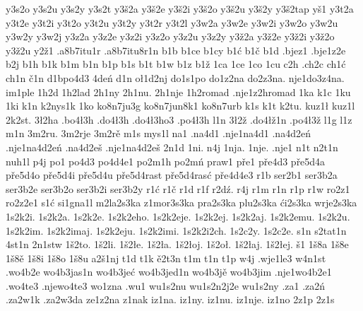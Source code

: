 {y3s2o
y3s2u
y3s2y
y3s2t
y3š2a
y3š2e
y3š2i
y3š2o
y3š2u
y3š2y
y3š2tap
yš1
y3t2a
y3t2e
y3t2i
y3t2o
y3t2u
y3t2y
y3t2r
y3t2l
y3w2a
y3w2e
y3w2i
y3w2o
y3w2u
y3w2y
y3w2j
y3z2a
y3z2e
y3z2i
y3z2o
y3z2u
y3z2y
y3ž2a
y3ž2e
y3ž2i
y3ž2o
y3ž2u
y2ž1
.a8b7itu1r
.a8b7itu8r1n
b1b
b1ce
b1cy
b1ć
b1č
b1d
.bjez1
.bje1z2e
b2j
b1h
b1k
b1m
b1n
b1p
b1s
b1t
b1w
b1z
b1ž
1ca
1ce
1co
1cu
c2h
.ch2c
ch1ć
ch1n
č1n
d1bpo4d3
4deń
d1n
oł1d2nj
do1s1po
do1z2na
do2z3na.
nje1do3z4na.
im1ple
1h2d
1h2lad
2h1ny
2h1nu.
2h1nje
1h2romad
.nje1z2hromad
1ka
k1c
1ku
1ki
k1n
k2nys1k
1ko
ko8n7ju3g
ko8n7jun8k1
ko8n7urb
k1s
k1t
k2tu.
kuz1ł
kuz1l
2k2st.
3ł2ha
.bo4ł3h
.do4ł3h
.do4ł3ho3
.po4ł3h
l1n
3ł2ž
.do4łž1n
.po4ł3ž
l1g
l1z
m1n
3m2ru.
3m2rje
3m2rě
m1s
mys1l
na1
.na4d1
.nje1na4d1
.na4d2eń
.nje1na4d2eń
.na4d2eš
.nje1na4d2eš
2n1d
1ni.
n4j
1nja.
1nje.
.nje1
n1t
n2t1n
nuh1l
p4j
po1
po4d3
po4d4e1
po2m1h
po2mń
praw1
pře1
pře4d3
pře5d4a
pře5d4o
pře5d4i
pře5d4u
pře5d4rast
pře5d4rasć
pře4d4e3
r1b
ser2b1
ser3b2a
ser3b2e
ser3b2o
ser3b2i
ser3b2y
r1ć
r1č
r1d
r1f
r2dź.
r4j
r1m
r1n
r1p
r1w
ro2z1
ro2z2e1
s1ć
si1gna1l
m2la2s3ka
z1mor3s3ka
pra2s3ka
plu2s3ka
ći2s3ka
wrje2s3ka
1s2k2i.
1s2k2a.
1s2k2e.
1s2k2eho.
1s2k2eje.
1s2k2ej.
1s2k2aj.
1s2k2emu.
1s2k2u.
1s2k2im.
1s2k2imaj.
1s2k2eju.
1s2k2imi.
1s2k2i2ch.
1s2c2y.
1s2c2e.
s1n
s2tat1n
4st1n
2n1stw
1š2to.
1š2li.
1š2łe.
1š2ła.
1š2łoj.
1š2oł.
1š2łaj.
1š2łej.
š1
1š8a
1š8e
1š8ě
1š8i
1š8o
1š8u
a2š1nj
t1d
t1k
ě2t3n
t1m
t1n
t1p
w4j
.wje1le3
w4n1st
.wo4b2e
wo4b3jas1n
wo4b3jeć
wo4b3jed1n
wo4b3jě
wo4b3jim
.nje1wo4b2e1
.wo4te3
.njewo4te3
wo1zna
.wu1
wu1s2nu
wu1s2n2j2e
wu1s2ny
.za1
.za2ń
.za2w1k
.za2w3da
ze1z2na
z1nak
iz1na.
iz1ny.
iz1nu.
iz1nje.
iz1no
2z1p
2z1s
}

